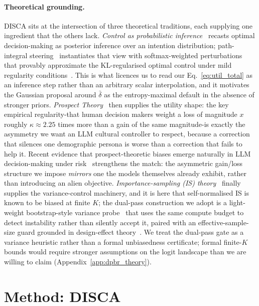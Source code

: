 \documentclass{article}
\begin{document}
\paragraph{Theoretical grounding.}
DISCA sits at the intersection of three theoretical traditions, each
supplying one ingredient that the others lack.
\emph{Control as probabilistic inference}~\citep{levine2018reinforcement,
todorov2009generalized} recasts optimal decision-making as posterior
inference over an intention distribution; path-integral
steering~\citep{williams2017mppi} instantiates that view
with softmax-weighted perturbations that provably approximate the KL-regularised
optimal control under mild regularity conditions~\citep{todorov2009generalized}.
This is what licences us to read our Eq.~\ref{eq:util_total} as an inference
step rather than an arbitrary scalar interpolation, and it motivates the
Gaussian proposal around $\bar\delta$ as the entropy-maximal default in the
absence of stronger priors.
\emph{Prospect Theory}~\citep{kahneman1979prospect, tversky1992advances} then
supplies the utility shape: the key empirical regularity-that human decision
makers weight a loss of magnitude $x$ roughly $\kappa{\approx}2.25$ times more
than a gain of the same magnitude-is exactly the asymmetry we want an
LLM cultural controller to respect, because a correction that silences one
demographic persona is worse than a correction that fails to help it.
Recent evidence that prospect-theoretic biases emerge naturally in LLM
decision-making under risk~\citep{payne2025prospect} strengthens the match:
the asymmetric gain/loss structure we impose \emph{mirrors} one the models
themselves already exhibit, rather than introducing an alien objective.
\emph{Importance-sampling (IS) theory}~\citep{elvira2021advances} finally supplies the variance-control machinery, and it is here that self-normalised IS is
known to be biased at finite $K$; the dual-pass construction we adopt is a
light-weight bootstrap-style variance probe~\citep{efron1979bootstrap} that
uses the same compute budget to detect instability rather than silently
accept it, paired with an effective-sample-size guard grounded in design-effect
theory~\citep{kish1965survey}.
We treat the dual-pass gate as a variance heuristic rather than a formal
unbiasedness certificate; formal finite-$K$ bounds would require stronger
assumptions on the logit landscape than we are willing to claim
(Appendix~\ref{app:dpbr_theory}).

\section{Method: DISCA}
\label{sec:method}
\end{document}
